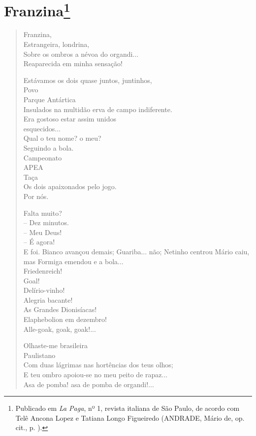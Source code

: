 \chapter{Franzina\footnote[*]{Publicado em \emph{La Paga}, nº 1, revista
  italiana de São Paulo, de acordo com Telê Ancona Lopez e Tatiana Longo
  Figueiredo (ANDRADE, Mário de, op. cit., p. ).}}

\begin{verse}
Franzina,\\
Estrangeira, londrina,\\
Sobre os ombros a névoa do organdi...\\
Reaparecida em minha sensação!

Estávamos os dois quase juntos, juntinhos,\\
\quad\quad\quad{}Povo\\
\quad\quad\quad{}Parque Antártica\\
Insulados na multidão erva de campo indiferente.\\
Era gostoso estar assim unidos\\
\quad\quad\quad\quad\quad\quad\quad{}esquecidos...\\
Qual o teu nome? o meu?\\
Seguindo a bola.\\
\quad\quad\quad\quad{}Campeonato\\
\quad\quad\quad{}APEA\\
\quad\quad{}Taça\\
Os dois apaixonados pelo jogo.\\
\quad\quad\quad\quad\quad{}Por nós.

Falta muito?\\
-- Dez minutos.\\
-- Meu Deus!\\
-- É agora!\\
E foi. Bianco avançou demais; Guariba... não; Netinho centrou Mário caiu, mas Formiga emendou e a bola...\\
\quad\quad\quad\quad\quad\quad{}Friedenreich!\\
\quad\quad\quad\quad\quad{}Goal!\\
\quad\quad\quad\quad{}Delírio-vinho!\\
\quad\quad\quad{}Alegria bacante!\\
\quad\quad{}As Grandes Dionisíacas!\\
\quad{}Elaphebolion em dezembro!\\
Alle-goak, goak, goak!...

Olhaste-me brasileira\\
\quad\quad\quad\quad{}Paulistano\\
Com duas lágrimas nas hortências dos teus olhos;\\
E teu ombro apoiou-se no meu peito de rapaz...\\
Asa de pomba! asa de pomba de organdi!...


\end{verse}
